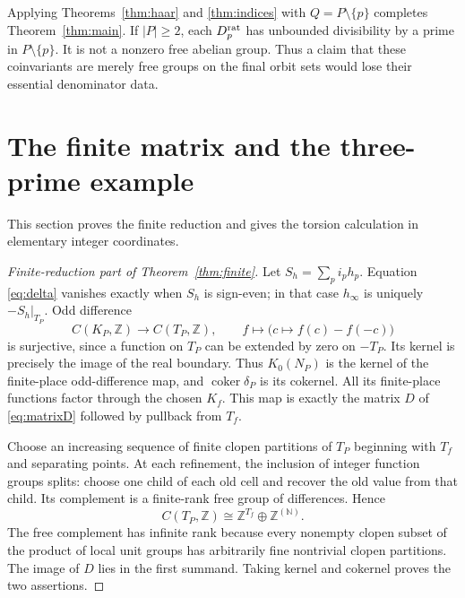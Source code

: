 \documentclass[11pt]{article}
\newcommand{\Z}{\mathbb Z}
\newcommand{\N}{\mathbb N}
\newcommand{\coker}{\operatorname{coker}}
\theoremstyle{definition}
\theoremstyle{remark}
\begin{document}
Applying Theorems~\ref{thm:haar} and \ref{thm:indices} with $Q=P\setminus\{p\}$ completes Theorem~\ref{thm:main}. If $|P|\geq2$, each $D_p^{\rm rat}$ has unbounded divisibility by a prime in $P\setminus\{p\}$. It is not a nonzero free abelian group. Thus a claim that these coinvariants are merely free groups on the final orbit sets would lose their essential denominator data.

\section{The finite matrix and the three-prime example}

This section proves the finite reduction and gives the torsion calculation in elementary integer coordinates.

\begin{proof}[Finite-reduction part of Theorem~\ref{thm:finite}]
Let $S_h=\sum_pi_ph_p$. Equation \eqref{eq:delta} vanishes exactly when $S_h$ is sign-even; in that case $h_\infty$ is uniquely $-S_h|_{T_P}$. Odd difference
\[
 C(K_P,\Z)\longrightarrow C(T_P,\Z),\qquad
 f\longmapsto\bigl(c\mapsto f(c)-f(-c)\bigr)
\]
is surjective, since a function on $T_P$ can be extended by zero on $-T_P$. Its kernel is precisely the image of the real boundary. Thus $K_0(N_P)$ is the kernel of the finite-place odd-difference map, and $\coker\delta_P$ is its cokernel. All its finite-place functions factor through the chosen $K_f$. This map is exactly the matrix $D$ of \eqref{eq:matrixD} followed by pullback from $T_f$.

Choose an increasing sequence of finite clopen partitions of $T_P$ beginning with $T_f$ and separating points. At each refinement, the inclusion of integer function groups splits: choose one child of each old cell and recover the old value from that child. Its complement is a finite-rank free group of differences. Hence
\[
 C(T_P,\Z)\cong\Z^{T_f}\oplus\Z^{(\N)}.
\]
The free complement has infinite rank because every nonempty clopen subset of the product of local unit groups has arbitrarily fine nontrivial clopen partitions. The image of $D$ lies in the first summand. Taking kernel and cokernel proves the two assertions.
\end{proof}
\end{document}
